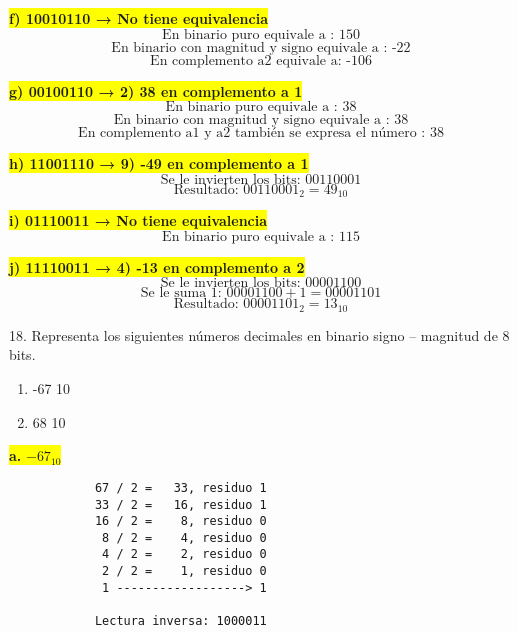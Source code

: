 \documentclass[a4paper,12pt]{article}
\begin{document}
		\begin{center}
		\colorbox{yellow}{{\textbf{f) 10010110 → No tiene equivalencia }}}
		\[
		\text{En binario puro equivale a : } 150
		\]
		\[
		\text{En binario con magnitud y signo equivale a : -22} 
		\]
		\[
		\text{En complemento a2 equivale a: -106}
		\]
	\end{center}

	\begin{center}
		\colorbox{yellow}{{\textbf{g) 00100110 → 2) 38 en complemento a 1}}}
		\[
		\text{En binario puro equivale a : } 38
		\]
		\[
		\text{En binario con magnitud y signo equivale a : 38} 
		\]
		\[
		\text{En complemento a1 y a2 también se expresa el número : 38} 
		\]
	\end{center}
	
	\begin{center}
		\colorbox{yellow}{{\textbf{h) 11001110 → 9) -49 en complemento a 1}}}
		\[
		\text{Se le invierten los bits: } 00110001
		\]
		\[
		\boxed{\text{Resultado: } 00110001_2 = 49_{10}}
		\]
		\end{center}

	\begin{center}
		\colorbox{yellow}{{\textbf{i) 01110011 → No tiene equivalencia }}}
		\[
		\text{En binario puro equivale a : } 115
		\]
	\end{center}

	\begin{center}
		\colorbox{yellow}{{\textbf{j) 11110011 → 4) -13 en complemento a 2}}}
		\[
		\text{Se le invierten los bits: } 00001100
		\]
		\[
		\text{Se le suma 1: } 00001100 + 1 = 00001101
		\]
		\[
		\boxed{\text{Resultado: } 00001101_2 = 13_{10}}
		\]
	\end{center}

	18. Representa los siguientes números decimales en binario signo – magnitud de 8 bits.
		\begin{enumerate}
			\item -67 10 
			\item 68 10
		\end{enumerate}
	
	\begin{center}
		\colorbox{yellow}{{\textbf{a.} $-67_{10}$}} \\ \vspace{0.3cm}
		\begin{Verbatim}
			67 / 2 =   33, residuo 1
			33 / 2 =   16, residuo 1
			16 / 2 =    8, residuo 0
			 8 / 2 =    4, residuo 0
			 4 / 2 =    2, residuo 0
			 2 / 2 =    1, residuo 0
			 1 ------------------> 1
			
			Lectura inversa: 1000011
		\end{Verbatim}
	\end{center}
\end{document}
